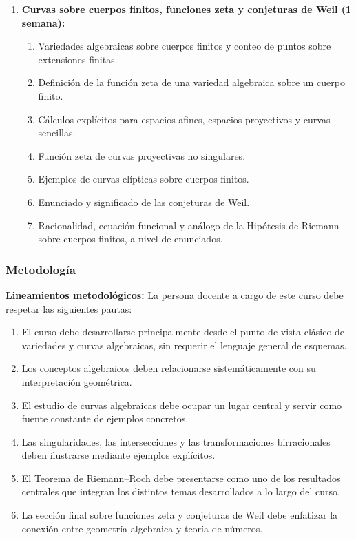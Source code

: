 \begin{refsection}
\begin{enumerate}
\item \textbf{Curvas sobre cuerpos finitos, funciones zeta y conjeturas de Weil (1 semana):}
\begin{enumerate}
\item Variedades algebraicas sobre cuerpos finitos y conteo de puntos sobre extensiones finitas.
\item Definición de la función zeta de una variedad algebraica sobre un cuerpo finito.
\item Cálculos explícitos para espacios afines, espacios proyectivos y curvas sencillas.
\item Función zeta de curvas proyectivas no singulares.
\item Ejemplos de curvas elípticas sobre cuerpos finitos.
\item Enunciado y significado de las conjeturas de Weil.
\item Racionalidad, ecuación funcional y análogo de la Hipótesis de Riemann sobre cuerpos finitos, a nivel de enunciados.
\end{enumerate}

\end{enumerate}

\subsubsection*{Metodología}

\noindent \textbf{Lineamientos metodológicos:} La persona docente a cargo de este curso debe respetar las siguientes pautas:
\begin{enumerate}
\item El curso debe desarrollarse principalmente desde el punto de vista clásico de variedades y curvas algebraicas, sin requerir el lenguaje general de esquemas.
\item Los conceptos algebraicos deben relacionarse sistemáticamente con su interpretación geométrica.
\item El estudio de curvas algebraicas debe ocupar un lugar central y servir como fuente constante de ejemplos concretos.
\item Las singularidades, las intersecciones y las transformaciones birracionales deben ilustrarse mediante ejemplos explícitos.
\item El Teorema de Riemann--Roch debe presentarse como uno de los resultados centrales que integran los distintos temas desarrollados a lo largo del curso.
\item La sección final sobre funciones zeta y conjeturas de Weil debe enfatizar la conexión entre geometría algebraica y teoría de números.
\end{enumerate}


\end{refsection}
